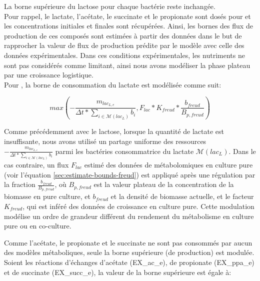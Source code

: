 La borne supérieure du lactose pour chaque bactérie reste inchangée. \\


Pour rappel, le lactate, l'acétate, le succinate et le propionate sont dosés pour \freud et les concentrations initiales et finales sont récupérées. Ainsi, les bornes des flux de production de ces composés sont estimées à partir des données dans le but de rapprocher la valeur de flux de production prédite par le modèle avec celle des données expérimentales. Dans ces conditions expérimentales, les nutriments ne sont pas considérés comme limitant, ainsi nous avons modéliser la phase plateau par une croissance logistique. \\

Pour \freud, la borne de consommation du lactate est modélisée comme suit:

\begin{equation}max(-\frac{m_{lac_{L,e}}}{\Delta t*\sum_{i \in \mathcal{M}(lac_L)} b_i},F_{lac}*K_{freud}* \frac{b_{freud}}{B_{p,freud}}) \label{eq:optim-K-lac}\end{equation}

Comme précédemment avec le lactose, lorsque la quantité de lactate est insuffisante, nous avons utilisé un partage uniforme des ressources $-\frac{m_{lac_{L,e}}}{\Delta t*\sum_{i \in \mathcal{M}(lac_L)} b_i}$ parmi les bactéries consommatrice du lactate $\mathcal{M}(lac_L)$. Dans le cas contraire, un flux $F_{lac}$ estimé des données de métabolomiques en culture pure (voir l'équation \ref{sec:estimate-bounds-freud}) est appliqué après une régulation par la fraction $\frac{b_{freud}}{B_{p,freud}}$, où $B_{p,freud}$ est la valeur plateau de la concentration de la biomasse en pure culture, et $b_{freud}$ et la densité de biomasse actuelle, et le facteur $K_{freud}$, qui est inféré des données de croissance en culture pure. Cette modulation modélise un ordre de grandeur différent du rendement du métabolisme en culture pure ou en co-culture.

Comme l'acétate, le propionate et le succinate ne sont pas consommés par aucun des modèles métaboliques, seule la borne supérieure (de production) est modulée. Soient les réactions d'échanges d'acétate (EX\_ac\_e), de propionate (EX\_ppa\_e) et de succinate (EX\_succ\_e), la valeur de la borne supérieure est égale à:

